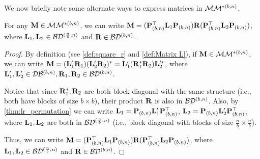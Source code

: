 We now briefly note some alternate ways to express matrices in $\mathcal{M}\mathcal{M}^{*(b,n)}$.
\begin{proposition}
\label{prop:mm-eqv-def}
For any $\mathbf{M} \in \mathcal{M}\mathcal{M}^{*(b,n)}$, we can write $\mathbf{M} = (\mathbf{P}_{(b,n)}^\top \mathbf{L}_1 \mathbf{P}_{(b,n)}) \mathbf{R} (\mathbf{P}_{(b,n)}^\top\mathbf{L}_2\mathbf{P}_{(b,n)})$, where $\mathbf{L}_1,\mathbf{L}_2 \in \mathcal{B}\mathcal{D}^{(\frac{n}{b},n)}$ and $\mathbf{R} \in \mathcal{B}\mathcal{D}^{(b,n)}$.
\end{proposition}
\begin{proof}
By definition (see \cref{def:square_r} and \cref{def:Matrix L}), if $\mathbf{M} \in \mathcal{M}\mathcal{M}^{*(b,n)}$, we can write
$\mathbf{M} = (\mathbf{L}_1' \mathbf{R}_1) (\mathbf{L}_2' \mathbf{R}_2)^* = \mathbf{L}_1' (\mathbf{R}_1^* \mathbf{R}_2) \mathbf{L}_2'^*$,
where $\mathbf{L}_1',\mathbf{L}_2' \in \mathcal{D}\mathcal{B}^{(b,n)},\mathbf{R}_1,\mathbf{R}_2 \in \mathcal{B}\mathcal{D}^{(b,n)}$.

Notice that since $\mathbf{R}_1^*, \mathbf{R}_2$ are both block-diagonal with the same structure (i.e., both have blocks of size $b \times b$), their product $\mathbf{R}$ is also in $\mathcal{B}\mathcal{D}^{(b,n)}$.
Also, by \cref{thm:lr_permutation} we can write $\mathbf{L}_1 = \mathbf{P}_{(b,n)} \mathbf{L}_1' \mathbf{P}_{(b,n)}^\top$, $\mathbf{L}_2 = \mathbf{P}_{(b,n)} \mathbf{L}_2' \mathbf{P}_{(b,n)}^\top$, where $\mathbf{L}_1,\mathbf{L}_2$ are both in $\mathcal{B}\mathcal{D}^{(\frac{n}{b},n)}$ (i.e., block diagonal with blocks of size $\frac{n}{b} \times \frac{n}{b}$).


Thus, we can write $\mathbf{M} = (\mathbf{P}_{(b,n)}^\top \mathbf{L}_1 \mathbf{P}_{(b,n)}) \mathbf{R} (\mathbf{P}_{(b,n)}^\top\mathbf{L}_2\mathbf{P}_{(b,n)})$, where $\mathbf{L}_1,\mathbf{L}_2 \in \mathcal{B}\mathcal{D}^{(\frac{n}{b},n)}$ and $\mathbf{R} \in \mathcal{B}\mathcal{D}^{(b,n)}$.
\end{proof}

